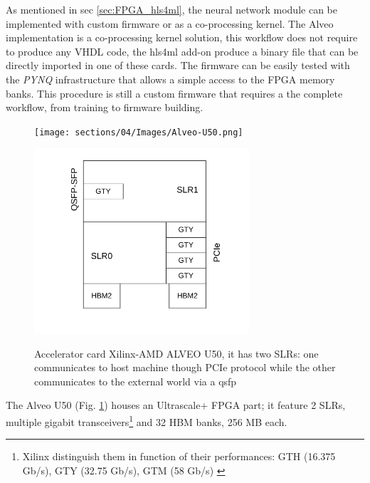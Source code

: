 \documentclass[../../main.tex]{subfiles}
\begin{document}
As mentioned in sec \ref{sec:FPGA_hls4ml}, the neural network module can be implemented with custom firmware or as a co-processing kernel. The Alveo implementation is a co-processing kernel solution, this workflow does not require to produce any VHDL code, the hls4ml add-on produce a binary file that can be directly imported in one of these cards. The firmware can be easily tested with the \textit{PYNQ} infrastructure that allows a simple access to the FPGA memory banks. This procedure is still a custom firmware that requires a the complete workflow, from training to firmware building.
    
\begin{figure}[h]
\begin{minipage}[c]{0.5\linewidth}
    \vspace{0pt}
    \centering
        \texttt{[image: sections/04/Images/Alveo-U50.png]}
        \label{fig:ALVEO-U50_card}
\end{minipage}%
\hfill%
\begin{minipage}[c]{0.5\linewidth}
    \vspace{0pt}
    \centering
        \includegraphics[width=8cm]{sections/04/Images/Alveo-U50-connections.pdf}
        \label{fig:ALVEO-U50_struct}
\end{minipage}%
\caption{Accelerator card Xilinx-AMD ALVEO U50, it has two SLRs: one communicates to host machine though PCIe protocol while the other communicates to the external world via a \acrshort{qsfp}}
\label{fig:ALVEO}
\end{figure}

The Alveo U50 (Fig. \ref{fig:ALVEO}) houses an Ultrascale+ FPGA part; it feature 2 SLRs, multiple gigabit transceivers\footnote{Xilinx distinguish them in function of their performances: GTH (16.375 Gb/s), GTY (32.75 Gb/s), GTM (58 Gb/s) \cite{Xilinx-GT}} and 32 HBM banks, 256 MB each.  
\end{document}
